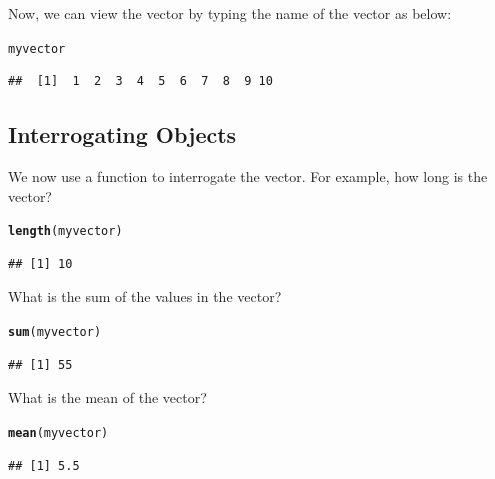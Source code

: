 \documentclass{tufte-handout}\usepackage[]{graphicx}\usepackage[]{color}
\makeatletter
\newcommand{\hlstd}[1]{\textcolor[rgb]{0.345,0.345,0.345}{#1}}%
\newcommand{\hlkwd}[1]{\textcolor[rgb]{0.737,0.353,0.396}{\textbf{#1}}}%
\newenvironment{kframe}{%
 \def\at@end@of@kframe{}%
 \ifinner\ifhmode%
  \def\at@end@of@kframe{\end{minipage}}%
  \begin{minipage}{\columnwidth}%
 \fi\fi%
 \def\FrameCommand##1{\hskip\@totalleftmargin \hskip-\fboxsep
 \colorbox{shadecolor}{##1}\hskip-\fboxsep
     \hskip-\linewidth \hskip-\@totalleftmargin \hskip\columnwidth}%
 \MakeFramed {\advance\hsize-\width
   \@totalleftmargin\z@ \linewidth\hsize
   \@setminipage}}%
 {\par\unskip\endMakeFramed%
 \at@end@of@kframe}
\newenvironment{knitrout}{}{} %
\makeatother
\begin{document}
Now, we can view the vector by typing the name of the vector as below:  

\begin{knitrout}
\color{fgcolor}\begin{kframe}
\begin{alltt}
\hlstd{myvector}
\end{alltt}
\begin{verbatim}
##  [1]  1  2  3  4  5  6  7  8  9 10
\end{verbatim}
\end{kframe}
\end{knitrout}

\subsection{Interrogating Objects}

We now use a function to interrogate the vector. For example, how long is the vector?

\begin{knitrout}
\color{fgcolor}\begin{kframe}
\begin{alltt}
\hlkwd{length}\hlstd{(myvector)}
\end{alltt}
\begin{verbatim}
## [1] 10
\end{verbatim}
\end{kframe}
\end{knitrout}

What is the sum of the values in the vector?

\begin{knitrout}
\color{fgcolor}\begin{kframe}
\begin{alltt}
\hlkwd{sum}\hlstd{(myvector)}
\end{alltt}
\begin{verbatim}
## [1] 55
\end{verbatim}
\end{kframe}
\end{knitrout}

What is the mean of the vector?

\begin{knitrout}
\color{fgcolor}\begin{kframe}
\begin{alltt}
\hlkwd{mean}\hlstd{(myvector)}
\end{alltt}
\begin{verbatim}
## [1] 5.5
\end{verbatim}
\end{kframe}
\end{knitrout}
\end{document}
